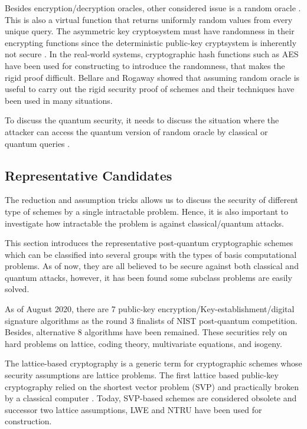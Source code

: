 Besides encryption/decryption oracles, 
other considered issue is a random oracle \cite{BR93}.
This is also a virtual function that returns uniformly random values from every unique query.
The asymmetric key cryptosystem must have randomness in their encrypting functions since the deterministic public-key cryptsystem is inherently not secure
\cite{Gol09book}.	%
In the real-world systems, cryptographic hash functions such as AES have been used for constructing to introduce the randomness, that makes the rigid proof difficult.
Bellare and Rogaway \cite{BR93} showed that assuming random oracle is useful to carry out the rigid security proof of schemes and their techniques have been used in many situations. 

To discuss the quantum security, it needs to discuss the situation where 
the attacker can access the quantum version of random oracle by classical or quantum queries \cite{BDFL+11}.



\subsection{Representative Candidates}

The reduction and assumption tricks allows us to discuss the security of different type of schemes by a single intractable problem.
Hence, it is also important to investigate 
how intractable the problem is against classical/quantum attacks.

This section introduces the representative post-quantum cryptographic schemes 
which can be classified into several groups with the types of basis computational problems.
As of now, they are all believed to be secure against both classical and quantum attacks, however, it has been found some subclass problems are easily solved. 

As of August 2020, there are 7 public-key encryption/Key-establishment/digital signature algorithms as the round 3 finalists of NIST post-quantum competition.
Besides, alternative 8 algorithms have been remained.
These securities rely on hard problems on lattice, coding theory, multivariate equations, and isogeny.

The lattice-based cryptography is a generic term for cryptographic schemes 
whose security assumptions are lattice problems.
The first lattice based public-key cryptography relied on the shortest vector problem (SVP) \cite{Aj96} and practically broken by a classical computer \cite{Nguyen97}.
Today, SVP-based schemes are considered obsolete and successor two lattice assumptions, LWE and NTRU have been used for construction.

